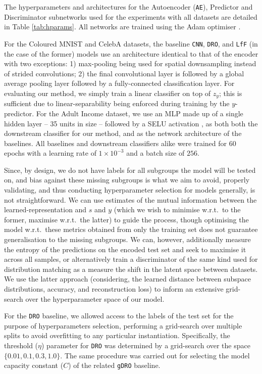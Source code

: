 The hyperparameters and architectures for the Autoencoder (\texttt{AE}), Predictor and Discriminator subnetworks used for the experiments with all datasets are detailed in Table \ref{tab:hparams}. All networks are trained using the Adam optimiser \citep{kingma2015adam}.

For the Coloured MNIST and CelebA datasets, the baseline \texttt{CNN}, \texttt{DRO}, and \texttt{LfF} (in the case of the former) models use an architecture identical to that of the encoder with two exceptions: 1) max-pooling being used for spatial downsampling instead of strided convolutions; 2) the final convolutional layer is followed by a global average pooling layer followed by a fully-connected classification layer. For evaluating our method, we simply train a linear classifier on top of $z_y$; this is sufficient due to linear-separability being enforced during training by the $y$-predictor.
For the Adult Income dataset, we use an \ac{MLP} made up of a single hidden layer -- 35 units in size -- followed by a SELU activation \citep{klambauer2017self}, as both both the downstream classifier for our method, and as the network architecture of the baselines. 
All baselines and downstream classifiers alike were trained for $60$ epochs with a learning rate of $1 \times 10^{-3}$ and a batch size of $256$.

Since, by design, we do not have labels for all subgroups the model will be tested on, and bias against these missing subgroups is what we aim to avoid, properly validating, and thus conducting hyperparameter selection for models generally, is not straightforward.
We can use estimates of the mutual information between the learned-representation and $s$ and $y$ (which we wish to minimise w.r.t.\ to the former, maximise w.r.t.\ the latter) to guide the process, though optimising the model w.r.t.\ these metrics obtained from only the training set does not guarantee generalisation to the missing subgroups.
We can, however, additionally measure the entropy of the predictions on the encoded test set and seek to maximise it across all samples, or alternatively train a discriminator of the same kind used for distribution matching as a measure the shift in the latent space between datasets.
We use the latter approach (considering, the learned distance between subspace distributions, accuracy, and reconstruction loss) to inform an extensive grid-search over the hyperparameter space of our model.

For the \texttt{DRO} baseline, we allowed access to the labels of the test set for the purpose of hyperparameters selection, performing a grid-search over multiple splits to avoid overfitting to any particular instantiation.
Specifically, the threshold ($\eta$) parameter for \texttt{DRO} was determined by a grid-search over the space $\{0.01, 0.1, 0.3, 1.0\}$. The same procedure was carried out for selecting the model capacity constant ($C$) of the related \texttt{gDRO} baseline.

